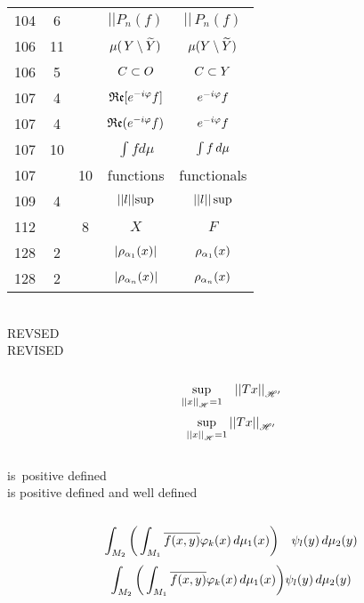 \documentclass[a4paper,11pt]{article}
\begin{document}
\begin{center}
\begin{tabular}{|c|c|c|c|c|}
    104 &  6 & & $||P_{ n }( f )$ & $|| \, P_{ n }( f )$ \\
    106 & 11 & & $\mu( \, Y \setminus \widetilde{ Y } )$
           & $\mu( Y \setminus \widetilde{ Y } )$ \\
    106 &  5 & & $C \subset O$ & $C \subset Y$ \\
    107 &  4 & & $\mathfrak{Re}[ e^{ -i \varphi } f ]$ & $e^{ -i \varphi } f$ \\
    107 &  4 & & $\mathfrak{Re}( e^{ -i \varphi } f )$ & $e^{ -i \varphi } f$ \\
    107 & 10 & & $\int\! fd\mu$ & $\int\limits  f  \, d \mu $ \\
    107 & & 10 & functions & functionals \\
    109 & 4 & & $\left|\left|  l  \right|\right|\!\sup$ & $\left|\left|  l  \right|\right| \sup$ \\
    112 & & 8 & $X$ & $F$ \\
    128 & 2 & & $| \rho_{ \alpha_{ 1 } }( x ) |$ & $\rho_{ \alpha_{ 1 } }( x )$ \\
    128 & 2 & & $| \rho_{ \alpha_{ n } }( x ) |$ & $\rho_{ \alpha_{ n } }( x )$ \\
    \hline
  \end{tabular}
\end{center}
\noi
{} \\
\Jest REVSED \\
\Pow  REVISED \\
 \\
\Jest
\begin{equation*}
  \sup_{ \substack{ \left|\left|  x  \right|\right|_{ \mathcal{H} } = 1 } } \;\;\; \left|\left|  T x  \right|\right|_{ \mathcal{H}' }
\end{equation*}
\Pow
\begin{equation*}
  \sup_{ \substack{ \left|\left|  x  \right|\right|_{ \mathcal{H} } = 1 } } \left|\left|  T x  \right|\right|_{ \mathcal{H}' }
\end{equation*}
 \\
\Jest is~positive defined \\
\Pow  is positive defined and well defined \\
 \\
\Jest
\begin{equation*}
  \int_{ M_{ 2 } } \bigg( \int_{ M_{ 1 } } \overline{ f( x, y ) } \varphi_{ k }( x ) \,
  d\mu_{ 1 }( x ) \bigg) \quad \psi_{ l }( y ) \, d\mu_{ 2 }( y )
\end{equation*}
\Pow
\begin{equation*}
  \int_{ M_{ 2 } } \bigg( \int_{ M_{ 1 } } \overline{ f( x, y ) } \varphi_{ k }( x ) \,
  d\mu_{ 1 }( x ) \bigg) \psi_{ l }( y ) \, d\mu_{ 2 }( y )
\end{equation*}





 {}



\end{document}
